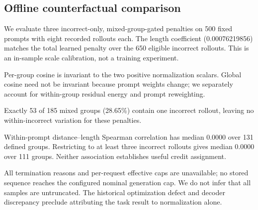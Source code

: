 
\subsection{Offline counterfactual comparison}

We evaluate three incorrect-only, mixed-group-gated penalties on 500 fixed prompts with eight recorded rollouts each. The length coefficient (0.00076219856) matches the total learned penalty over the 650 eligible incorrect rollouts. This is an in-sample scale calibration, not a training experiment.



Per-group cosine is invariant to the two positive normalization scalars. Global cosine need not be invariant because prompt weights change; we separately account for within-group residual energy and prompt reweighting.

Exactly 53 of 185 mixed groups (28.65\%) contain one incorrect rollout, leaving no within-incorrect variation for these penalties.

Within-prompt distance--length Spearman correlation has median 0.0000 over 131 defined groups. Restricting to at least three incorrect rollouts gives median 0.0000 over 111 groups. Neither association establishes useful credit assignment.

All termination reasons and per-request effective caps are unavailable; no stored sequence reaches the configured nominal generation cap. We do not infer that all samples are untruncated. The historical optimization defect and decoder discrepancy preclude attributing the task result to normalization alone.
